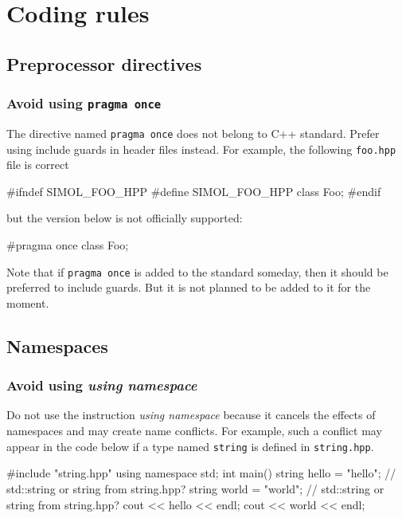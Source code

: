 


\chapter{Coding rules}


\section{Preprocessor directives}


\subsection{Avoid using \texttt{pragma once}}

The directive named \texttt{pragma once} does not belong to C++ standard. Prefer using include guards in header files instead. For example, the following \texttt{foo.hpp} file is correct
\begin{cppcode}
	#ifndef SIMOL_FOO_HPP
	#define SIMOL_FOO_HPP
	class Foo;
	#endif
\end{cppcode}
but the version below is not officially supported:
\begin{cppcode}
	#pragma once
	class Foo;
\end{cppcode}
Note that if \texttt{pragma once} is added to the standard someday, then it should be preferred to include guards. But it is not planned to be added to it for the moment.


\section{Namespaces}


\subsection{Avoid using \textit{using namespace}}

Do not use the instruction \textit{using namespace} because it cancels the effects of namespaces and may create name conflicts. For example, such a conflict may appear in the code below if a type named \texttt{string} is defined in \texttt{string.hpp}.

\begin{cppcode}
	#include "string.hpp"
	using namespace std;
	int main()
	{
		string hello = "hello"; // std::string or string from string.hpp?
		string world = "world"; // std::string or string from string.hpp?
		cout << hello << endl;
		cout << world << endl;
	}
\end{cppcode}

